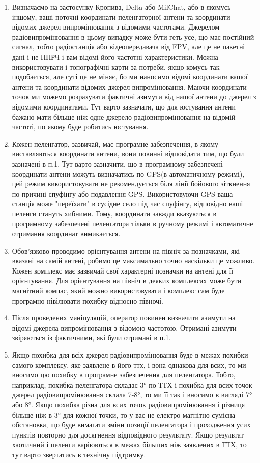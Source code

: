\documentclass{article}
\begin{document}
\begin{enumerate}[noitemsep, topsep=8pt]
	\item Визначаємо на застосунку Кропива, Delta або MilChat, або в якомусь іншому, ваші поточні координати пеленгаторної антени та координати відомих джерел випромінювання з відомими частотами. Джерелом радіовипромінювання в цьому випадку може бути геть усе, що має постійний сигнал, тобто радіостанція або відеопередавача від FPV, але це не пакетні дані і не ППРЧ і вам відомі його частотні характеристики. Можна використовувати і топографічні карти за потреби, якщо комусь так подобається, але суті це не міняє, бо ми наносимо відомі координати вашої антени та координати відомих джерел випромінювання. Маючи координати точок ми можемо розрахувати фактичні азимути від нашої антени до джерел з відомими координатами. Тут варто зазначати, що для юстування антени бажано мати більше ніж одне джерело радіовипромінювання на відомій частоті, по якому буде робитись юстування.
	\item Кожен пеленгатор, зазвичай, має програмне забезпечення, в якому виставляються координати антени, вони повинні відповідати тим, що були зазначені в п.1. Тут варто зазначити, що в програмному забезпечені координати антени можуть визначатись по GPS(в автоматичному режимі), цей режим використовувати не рекомендується біля лінії бойового зіткнення по причині спуфінгу або подавлення GPS. Використовуючи GPS ваша станція може "переїхати" в сусідне село під час спуфінгу, відповідно ваші пеленги стануть хибними. Тому, координати завжди вказуються в програмному забезпечені пеленгатора тільки в ручному режимі і автоматичне отримання координат вимикається.
	\item Обов'язково проводимо орієнтування антени на північ за позначками, які вказані на самій антені, робимо це максимально точно наскільки це можливо. Кожен комплекс має зазвичай свої характерні позначки на антені для її орієнтування. Для орієнтування на північ в деяких комплексах може бути магнітний компас, який можно використовувати і комплекс сам буде програмно нівілювати похибку відносно півночі.
	\item Після проведених маніпуляцій, оператор повинен визначити азимути на відомі джерела випромінювання з відомою частотою. Отримані азимути звіряються із фактичними, які були отримані в п.1. 
	\item Якщо похибка для всіх джерел радіовипромінювання буде в межах похибки самого комплексу, яке заявлене в його ттх, і вона однакова для всих, то ми вносимо цю похибку в програмне забезпечення для пеленгатора. Тобто, наприклад, похибка пеленгатора складає 3° по ТТХ і похибка для всих точок джерел радіовипромінювання склала 7-8°, то ми її так і вносимо в вигляді 7° або 8°. Якщо похибка різна для всих точок радіовипромінювання і різниця більше ніж в 3° для кожної точки, то у вас не електро-магнітно сумісна обстановка, що буде вимагати зміни позиції пеленгатора і проходження усих пунктів повторно для досягнення відповідного результату. Якщо результат хаотичний і пеленги варіюються в межах більших ніж заявлених в ТТХ, то тут варто звертатись в технічну підтримку.
\end{enumerate}
\end{document}
